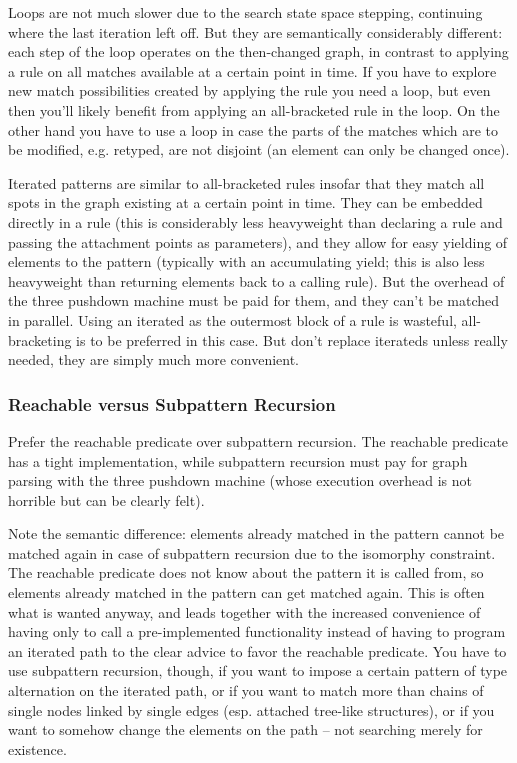 Loops are not much slower due to the search state space stepping, continuing where the last iteration left off.
But they are semantically considerably different: each step of the loop operates on the then-changed graph, in contrast to applying a rule on all matches available at a certain point in time.
If you have to explore new match possibilities created by applying the rule you need a loop, but even then you'll likely benefit from applying an all-bracketed rule in the loop.
On the other hand you have to use a loop in case the parts of the matches which are to be modified, e.g. retyped, are not disjoint (an element can only be changed once).

Iterated patterns are similar to all-bracketed rules insofar that they match all spots in the graph existing at a certain point in time.
They can be embedded directly in a rule (this is considerably less heavyweight than declaring a rule and passing the attachment points as parameters), and they allow for easy yielding of elements to the pattern (typically with an accumulating yield; this is also less heavyweight than returning elements back to a calling rule).
But the overhead of the three pushdown machine must be paid for them, and they can't be matched in parallel.
Using an iterated as the outermost block of a rule is wasteful, all-bracketing is to be preferred in this case.
But don't replace iterateds unless really needed, they are simply much more convenient.

\subsubsection*{Reachable versus Subpattern Recursion}
Prefer the reachable predicate over subpattern recursion.
The reachable predicate has a tight implementation, while subpattern recursion must pay for graph parsing with the three pushdown machine (whose execution overhead is not horrible but can be clearly felt).

Note the semantic difference: elements already matched in the pattern cannot be matched again in case of subpattern recursion due to the isomorphy constraint. 
The reachable predicate does not know about the pattern it is called from, so elements already matched in the pattern can get matched again.
This is often what is wanted anyway, and leads together with the increased convenience of having only to call a pre-implemented functionality instead of having to program an iterated path to the clear advice to favor the reachable predicate.
You have to use subpattern recursion, though, if you want to impose a certain pattern of type alternation on the iterated path, 
or if you want to match more than chains of single nodes linked by single edges (esp. attached tree-like structures), 
or if you want to somehow change the elements on the path -- not searching merely for existence.

